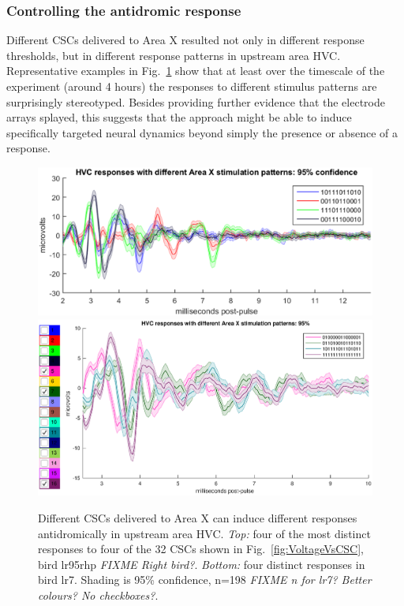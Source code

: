 \documentclass[10pt,letterpaper]{article}
\newcommand\fig[1]{Fig.~\ref{#1}}
\begin{document}
\subsubsection{Controlling the antidromic response}

Different CSCs delivered to Area X resulted not only in different response thresholds, but in different response patterns in upstream area HVC. Representative
examples in \fig{fig:HVCresponseVsCSC} show that at least over the timescale of the experiment (around 4 hours) the responses to different stimulus patterns are surprisingly stereotyped. Besides providing further
evidence that the electrode arrays splayed, this suggests that the
approach might be able to induce specifically targeted neural dynamics
beyond simply the presence or absence of a response.

\begin{figure}
  \includegraphics[width=\textwidth]{HVCresponseVsCSC}
  \includegraphics[width=\textwidth]{lr7-unique-responses-10-07-a}
  \caption{Different CSCs delivered to Area X can induce different
    responses antidromically in upstream area HVC.  {\em Top:} four of the most
    distinct responses to four of the 32 CSCs shown in
    \fig{fig:VoltageVsCSC}, bird lr95rhp {\em FIXME Right bird?}.
        {\em Bottom:} four distinct responses in bird lr7. Shading is
        95\% confidence, n=198 {\em FIXME n for lr7? Better colours? No checkboxes?}.}
  \label{fig:HVCresponseVsCSC}
\end{figure}
\end{document}
